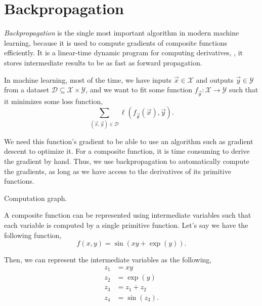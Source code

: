 \section{Backpropagation} \label{sec:backpropagation}

\textit{Backpropagation} is the single most important algorithm in modern
machine learning, because it is used to compute gradients of composite
functions efficiently. It is a linear-time dynamic program for computing
derivatives, \ie, it stores intermediate results to be as fast as forward
propagation.

In machine learning, most of the time, we have inputs $\vec{x}\in\mathcal{X}$
and outputs $\vec{y}\in\mathcal{Y}$ from a dataset
$\mathcal{D}\subseteq\mathcal{X}\times\mathcal{Y}$, and we want to fit some
function $f_{\vec{\theta}}: \mathcal{X} \to \mathcal{Y}$ such that it minimizes
some loss function, \[
  \sum_{(\vec{x},\vec{y})\in\mathcal{D}} \ell(f_{\vec{\theta}}(\vec{x}),\vec{y})
.\]

We need this function's gradient to be able to use an algorithm such as
gradient descent to optimize it. For a composite function, it is time
consuming to derive the gradient by hand. Thus, we use backpropagation to
automatically compute the gradients, as long as we have access to the
derivatives of its primitive functions.

\begin{example}
  \caption{Computation graph.}
  \label{ex:comp-graph}
  A composite function can be represented using intermediate variables such
  that each variable is computed by a single primitive function. Let's say we
  have the following function, \[
    f(x,y)=\sin(xy + \exp(y))
  .\]

  Then, we can represent the intermediate variables as the following,
  \begin{align*}
    z_1 &= xy \\
    z_2 &= \exp(y) \\
    z_3 &= z_1 + z_2 \\
    z_4 &= \sin(z_3)
  .\end{align*}

\end{example}

